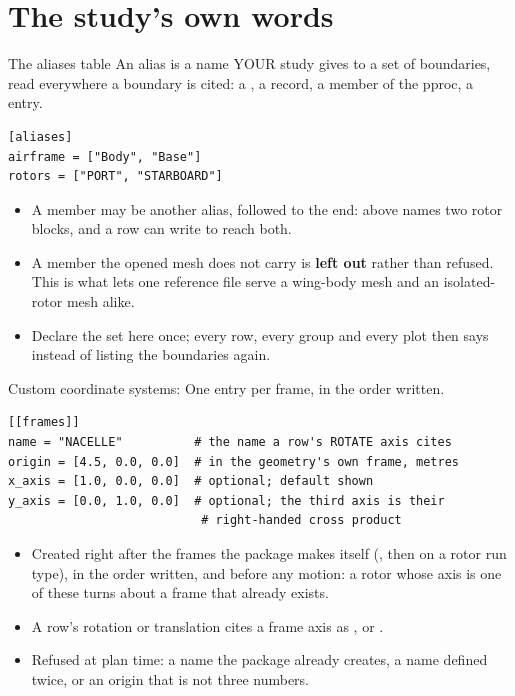 %
\section{The study's own words}

\begin{frame}[fragile]{The aliases table}
\small An alias is a name YOUR study gives to a set of boundaries, read
everywhere a boundary is cited: a , a 
record, a \code{[groups]} member of the pproc, a  entry.
\begin{lstlisting}[basicstyle=\ttfamily\scriptsize,numbers=none]
[aliases]
airframe = ["Body", "Base"]
rotors = ["PORT", "STARBOARD"]
\end{lstlisting}
\begin{itemize}\small
  \item A member may be another alias, followed to the end: 
        above names two rotor blocks, and a row can write  to
        reach both.
  \item A member the opened mesh does not carry is \textbf{left out}
        rather than refused. This is what lets one reference file serve a
        wing-body mesh and an isolated-rotor mesh alike.
  \item Declare the set here once; every row, every group and every plot
        then says  instead of listing the boundaries again.
\end{itemize}
\end{frame}

\begin{frame}[fragile]{Custom coordinate systems: \code{[[frames]]}}
\small One entry per frame, in the order written.
\begin{lstlisting}[basicstyle=\ttfamily\scriptsize,numbers=none]
[[frames]]
name = "NACELLE"          # the name a row's ROTATE axis cites
origin = [4.5, 0.0, 0.0]  # in the geometry's own frame, metres
x_axis = [1.0, 0.0, 0.0]  # optional; default shown
y_axis = [0.0, 1.0, 0.0]  # optional; the third axis is their
                           # right-handed cross product
\end{lstlisting}
\begin{itemize}\small
  \item Created right after the frames the package makes itself
        (, then  on a rotor run type), in the
        order written, and before any motion: a rotor whose axis is one of
        these turns about a frame that already exists.
  \item A row's rotation or translation cites a frame axis as
        ,  or .
  \item Refused at plan time: a name the package already creates, a name
        defined twice, or an origin that is not three numbers.
\end{itemize}
\end{frame}

